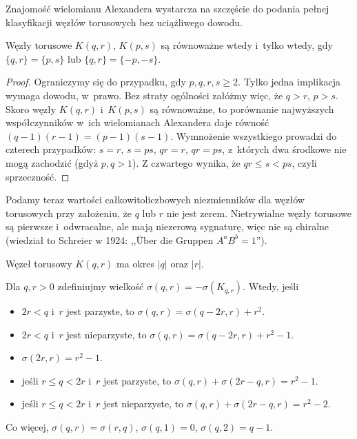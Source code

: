 Znajomość wielomianu Alexandera wystarcza na szczęście do podania pełnej klasyfikacji węzłów torusowych bez uciążliwego dowodu.

\begin{proposition}
    Węzły torusowe $K(q, r)$, $K(p, s)$ są równoważne wtedy i~tylko wtedy, gdy $\{q, r\} = \{p, s\}$ lub $\{q, r\} = \{-p, -s\}$.
\end{proposition}

\begin{proof}
    Ograniczymy się do przypadku, gdy $p, q, r, s \ge 2$.
    Tylko jedna implikacja wymaga dowodu, w~prawo.
    Bez straty ogólności załóżmy więc, że $q > r$, $p > s$.
    Skoro węzły $K(q, r)$ i~$K(p,s)$ są równoważne, to porównanie najwyższych współczynników w~ich wielomianach Alexandera daje równość $(q-1)(r-1) = (p-1)(s-1)$.
    Wymnożenie wszystkiego prowadzi do czterech przypadków: $s = r$, $s = ps$, $qr = r$, $qr = ps$, z~których dwa środkowe nie mogą zachodzić (gdyż $p, q > 1$).
    Z czwartego wynika, że $qr \le s < ps$, czyli sprzeczność.
\end{proof}

Podamy teraz wartości całkowitoliczbowych niezmienników dla węzłów torusowych przy założeniu, że $q$ lub $r$ nie jest zerem.
Nietrywialne węzły torusowe są pierwsze i~odwracalne, ale mają niezerową sygnaturę, więc nie są chiralne (wiedział to Schreier w 1924: ,,Über die Gruppen $A^a B^b = 1$'').

\begin{proposition}
    Węzeł torusowy $K(q, r)$ ma okres $|q|$ oraz $|r|$.
\end{proposition}

\begin{proposition}
    Dla $q, r > 0$ zdefiniujmy wielkość $\sigma(q, r) = - \sigma(K_{q, r})$.
    Wtedy, jeśli
    \begin{itemize}[leftmargin=*]
    \itemsep0em
        \item $2r < q$ i~$r$ jest parzyste, to $\sigma(q, r) = \sigma(q-2r, r) + r^2$.
        \item $2r < q$ i~$r$ jest nieparzyste, to $\sigma(q, r) = \sigma(q-2r, r) + r^2 - 1$.
        \item $\sigma(2r, r) = r^2 - 1$.
        \item jeśli $r \le q < 2r$ i~$r$ jest parzyste, to $\sigma(q, r) + \sigma(2r-q, r) = r^2-1$.
        \item jeśli $r \le q < 2r$ i~$r$ jest nieparzyste, to $\sigma(q, r) + \sigma(2r-q, r) = r^2-2$.
    \end{itemize}
    Co więcej, $\sigma(q, r) = \sigma(r, q)$, $\sigma(q, 1) = 0$, $\sigma(q, 2) = q-1$.
\end{proposition}

